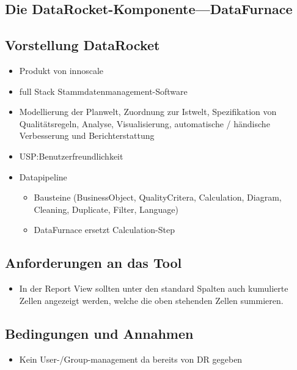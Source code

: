 \documentclass[
  language=german, %
  type=bachelor%
]{isthesis}
\begin{document}
\begin{content}
  \chapter{Die DataRocket-Komponente---DataFurnace}

  \section{Vorstellung DataRocket}
\label{sec:Vorstellung-DataRocket}
  \begin{itemize}
    \item Produkt von innoscale
    \item full Stack Stammdatenmanagement-Software
    \item Modellierung der Planwelt, Zuordnung zur Istwelt, Spezifikation von
      Qualitätsregeln, Analyse, Visualisierung, automatische / händische
      Verbesserung und Berichterstattung
    \item USP:\@ Benutzerfreundlichkeit 
    \item Datapipeline
      \begin{itemize}
        \item Bausteine (BusinessObject, QualityCritera, Calculation, Diagram, Cleaning, Duplicate, Filter, Language)
        \item DataFurnace ersetzt Calculation-Step
      \end{itemize}
  \end{itemize}

  \section{Anforderungen an das Tool}
  \begin{itemize}
    \item In der Report View sollten unter den standard Spalten auch kumulierte
      Zellen angezeigt werden, welche die oben stehenden Zellen summieren.
  \end{itemize}

  \section{Bedingungen und Annahmen}
  \begin{itemize}
    \item Kein User-/Group-management da bereits von DR gegeben
  \end{itemize}


\end{content}
\end{document}

